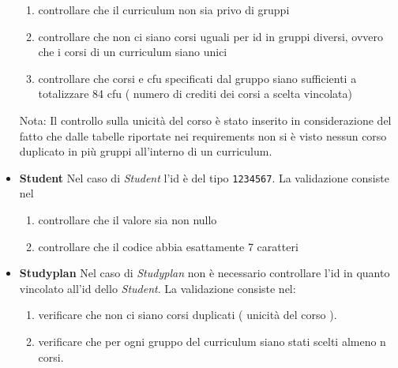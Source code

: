 \documentclass{article}
\begin{document}
\begin{itemize}
\begin{enumerate}
\item controllare che il curriculum non sia privo di gruppi
\item controllare che non ci siano corsi uguali per id in gruppi diversi, ovvero che i corsi di un curriculum siano unici
\item controllare che corsi e cfu specificati dal gruppo siano sufficienti a totalizzare 84 cfu ( numero di crediti dei corsi a scelta vincolata)
\end{enumerate}
Nota: Il controllo sulla unicità del corso è stato inserito in considerazione del fatto che dalle tabelle riportate nei requirements non si è visto nessun corso duplicato in più gruppi all'interno di un curriculum.
\item \textbf{Student}
Nel caso di \emph{Student} l'id è del tipo \texttt{1234567}. La validazione consiste nel
\begin{enumerate}
\item controllare che il valore sia non nullo
\item controllare che il codice abbia esattamente 7 caratteri
\end{enumerate}
\item \textbf{Studyplan}
Nel caso di \emph{Studyplan} non è necessario controllare l'id in quanto vincolato all'id dello \emph{Student}.
La validazione consiste nel:
\begin{enumerate}
\item verificare che non ci siano corsi duplicati ( unicità del corso ).
\item verificare che per ogni gruppo del curriculum siano stati scelti almeno n corsi.
\end{enumerate}
\end{itemize}
\end{document}
